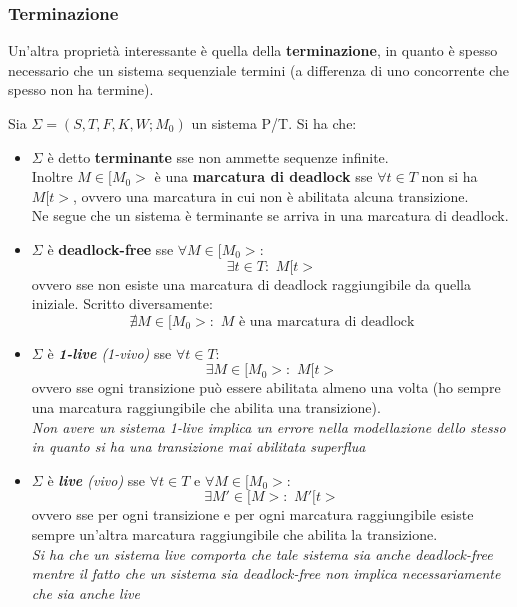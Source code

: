 \documentclass[a4paper,12pt, oneside]{book}
\begin{document}
\subsubsection{Terminazione}
Un'altra proprietà interessante è quella della \textbf{terminazione}, in quanto
è spesso necessario che un sistema sequenziale termini (a differenza di uno
concorrente che spesso non ha termine).
\begin{definizione}
  Sia $\Sigma=(S,T,F,K,W;M_0)$ un sistema P/T. Si ha che:
  \begin{itemize}
    \item $\Sigma$ è detto \textbf{terminante} sse non ammette sequenze
    infinite.\\
    Inoltre $M\in[M_0>$ è una \textbf{marcatura di deadlock} sse $\forall t\in
    T$ non si ha $M[t>$, ovvero una marcatura in cui non è abilitata alcuna
    transizione. \\
    Ne segue che un sistema è terminante se arriva in una marcatura di
    deadlock.\\
    \item $\Sigma$ è \textbf{deadlock-free} sse $\forall M\in[M_0>$:
    \[\exists t\in T:\,\, M[t>\]
    ovvero sse non esiste una marcatura di deadlock raggiungibile da quella
    iniziale. Scritto diversamente:
    \[\nexists M\in[M_0>:\,\,M\mbox{ è una marcatura di deadlock}\]
    \item $\Sigma$ è \textit{\textbf{1-live} (1-vivo)} sse $\forall t\in T$:
    \[\exists M\in [M_0>:\,\,M[t>\]
    ovvero sse ogni transizione può essere abilitata almeno una volta (ho sempre
    una marcatura raggiungibile che abilita una transizione).\\
    \textit{Non avere un sistema 1-live implica un errore nella modellazione
      dello stesso in quanto si ha una transizione mai abilitata superflua}
    \item $\Sigma$ è \textit{\textbf{live} (vivo)} sse $\forall t\in T$ e
    $\forall M\in[M_0>$:
    \[\exists M'\in[M>:\,\,M'[t>\]
    ovvero sse per ogni transizione e per ogni marcatura raggiungibile esiste
    sempre un'altra marcatura raggiungibile che abilita la transizione.\\
    \textit{Si ha che un sistema \emph{live} comporta che tale sistema sia anche
      \emph{deadlock-free} mentre il fatto che un sistema sia
      \emph{deadlock-free} non implica necessariamente che sia anche
      \emph{live}} 
  \end{itemize}
\end{definizione}
\newpage
\end{document}
